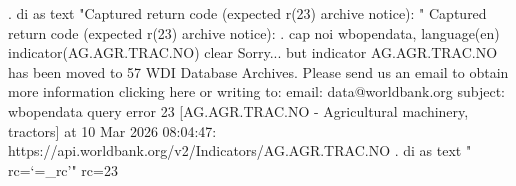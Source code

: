 . di as text "Captured return code (expected r(23) archive notice): "
Captured return code (expected r(23) archive notice): 
{\smallskip}
. cap noi wbopendata, language(en) indicator(AG.AGR.TRAC.NO) clear
{\smallskip}
    Sorry... but indicator AG.AGR.TRAC.NO has been moved to 57 WDI Database
    Archives.
{\smallskip}
    Please send us an email to obtain more information clicking here or
    writing to:
            email: data@worldbank.org
            subject: wbopendata query error 23 [AG.AGR.TRAC.NO - Agricultural
    machinery, tractors] at 10 Mar 2026 08:04:47:
    https://api.worldbank.org/v2/Indicators/AG.AGR.TRAC.NO
{\smallskip}
{\smallskip}
{\smallskip}
. di as text "  rc=`=_rc'"
  rc=23
